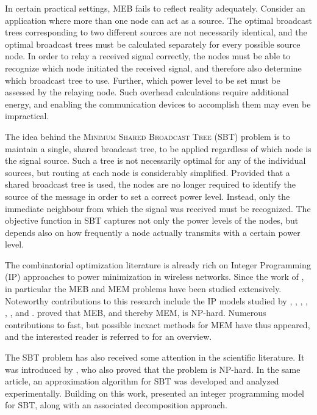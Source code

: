 In certain practical settings, MEB fails to reflect reality adequately.
Consider an application where more than one node can act as a source.
The optimal broadcast trees corresponding to two different sources are not necessarily identical,
and the optimal broadcast trees must be calculated separately for every possible source node.
In order to relay a received signal correctly, the nodes must be able to recognize which node initiated the received signal, and therefore also determine which broadcast tree to use.
Further, which power level to be set must be assessed by the relaying node.
Such overhead calculations require additional energy, and enabling the communication devices to accomplish them may even be impractical.

The idea behind the \textsc{Minimum Shared Broadcast Tree} (SBT) problem is to maintain a single, shared broadcast tree, to be applied regardless of which node is the signal source.
Such a tree is not necessarily optimal for any of the individual sources, but routing at each node is considerably simplified.
Provided that a shared broadcast tree is used, the nodes are no longer required to identify the source of the message in order to set a correct power level.
Instead, only the immediate neighbour from which the signal was received must be recognized.
The objective function in SBT captures not only the power levels of the nodes, but depends also on how frequently a node actually transmits with a certain power level.

The combinatorial optimization literature is already rich on Integer Programming (IP) approaches to power minimization in wireless networks.
Since the work of \citet{Wieseltier00onthe}, in particular the MEB and MEM problems have been studied extensively.
Noteworthy contributions to this research include the IP models studied by \citet{das03},
\citet{altinkemer05}, \citet{leggieri08}, \citet{yuan05}, \citet{yuan08}, \citet{bauer08}, and \citet{montemanni11}.
\citet{cagalj02} proved that MEB, and thereby MEM, is NP-hard.
Numerous contributions to fast, but possible inexact methods for MEM have thus appeared, and the interested reader is referred to \citep{hsiao13} for an overview.

The SBT problem has also received some attention in the scientific literature.
It was introduced by \citet{Papadimitriou06SBT}, who also proved that the problem is NP-hard.
In the same article, an approximation algorithm for SBT was developed and analyzed experimentally.
Building on this work, \citet{Haugland12Dual} presented an integer programming model for SBT, along with an associated decomposition approach.

